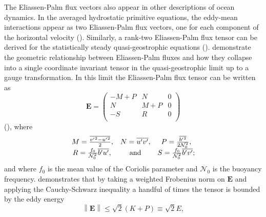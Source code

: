 \documentclass[12pt,a4paper]{report}
\newcommand*\mean[1]{\overline{#1}}
\newcommand*\res[1]{{#1}^{\prime}}
\begin{document}
                
                The Eliassen-Palm flux vectors also appear in other descriptions of ocean dynamics.
                In the averaged hydrostatic primitive equations, the eddy-mean interactions
                appear as two Eliassen-Palm flux vectors, one for each component of the horizontal velocity
                (\cite{young2012exact}). Similarly, a rank-two Eliassen-Palm flux tensor
                can be derived for the statistically steady quasi-geostrophic equations (\cite{cronin1996eddy}). \cite{maddison2013eliassen} demonstrate
                the geometric relationship between Eliassen-Palm fluxes and how they
                collapse into a single coordinate invariant tensor in the
                quasi-geostrophic limit up to a gauge transformation.
                In this limit the Eliassen-Palm flux tensor can be written as
                \begin{equation}
                \boldsymbol{E} 
                =\left(  \begin{array}{ccc}
                -M+P &
                N & 0 \\
                N &  
                M + P & 0\\
                -S  &  
                R & 0\\
                \end{array} \right) 
                \end{equation}
                (\cite{plumb1986three}), where 
                \begin{equation}
                \begin{array}{ccc}
                M = \frac{\mean{{\res{v}}^{2} - {\res{u}}^{2}}}{2}, & 
                N = \mean{\res{u}\res{v} }, &
                P =  \frac{\mean{{\res{b}}^{2}}}{2\mathcal{N}_{0}^{2}},  \\ 
                R =  \frac{f_{0}}{\mathcal{N}_{0}^{2}}\mean{\res{b}\res{u}}, \, & \rm and  &  
                S = \frac{f_{0}}{\mathcal{N}_{0}^{2}}\mean{\res{b}\res{v}} ;
                \end{array} 
                \end{equation}
                 and where $f_{0}$ is the mean value of the Coriolis parameter and $\mathcal{N}_{0}$ is the buoyancy frequency. \cite{marshall2012framework}
                demonstrates that by taking a weighted Frobenius norm on $\boldsymbol{E} $
                and applying the Cauchy-Schwarz inequality a handful of times the 
                 tensor is bounded by the eddy energy
                 \begin{equation}
                 {\left\|\boldsymbol{E}\right\|\leq\sqrt{2}\left(K+P\right)\equiv \sqrt{2}E},
                 \end{equation} 
\end{document}
